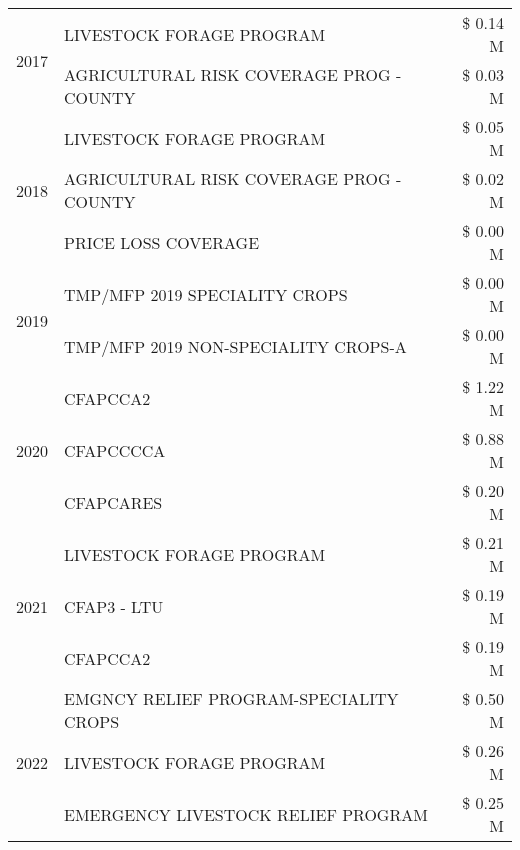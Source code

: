 \begin{tabular}{llr}
\cline{1-3}
\multirow[t]{2}{*}{2017} & LIVESTOCK FORAGE PROGRAM & \$ 0.14 M \\
 & AGRICULTURAL RISK COVERAGE PROG - COUNTY & \$ 0.03 M \\
\cline{1-3}
\multirow[t]{3}{*}{2018} & LIVESTOCK FORAGE PROGRAM & \$ 0.05 M \\
 & AGRICULTURAL RISK COVERAGE PROG - COUNTY & \$ 0.02 M \\
 & PRICE LOSS COVERAGE & \$ 0.00 M \\
\cline{1-3}
\multirow[t]{2}{*}{2019} & TMP/MFP 2019 SPECIALITY CROPS & \$ 0.00 M \\
 & TMP/MFP 2019 NON-SPECIALITY CROPS-A & \$ 0.00 M \\
\cline{1-3}
\multirow[t]{3}{*}{2020} & CFAPCCA2 & \$ 1.22 M \\
 & CFAPCCCCA & \$ 0.88 M \\
 & CFAPCARES & \$ 0.20 M \\
\cline{1-3}
\multirow[t]{3}{*}{2021} & LIVESTOCK FORAGE PROGRAM & \$ 0.21 M \\
 & CFAP3 - LTU & \$ 0.19 M \\
 & CFAPCCA2 & \$ 0.19 M \\
\cline{1-3}
\multirow[t]{3}{*}{2022} & EMGNCY RELIEF PROGRAM-SPECIALITY CROPS & \$ 0.50 M \\
 & LIVESTOCK FORAGE PROGRAM & \$ 0.26 M \\
 & EMERGENCY LIVESTOCK RELIEF PROGRAM & \$ 0.25 M \\
\cline{1-3}
\bottomrule
\end{tabular}
